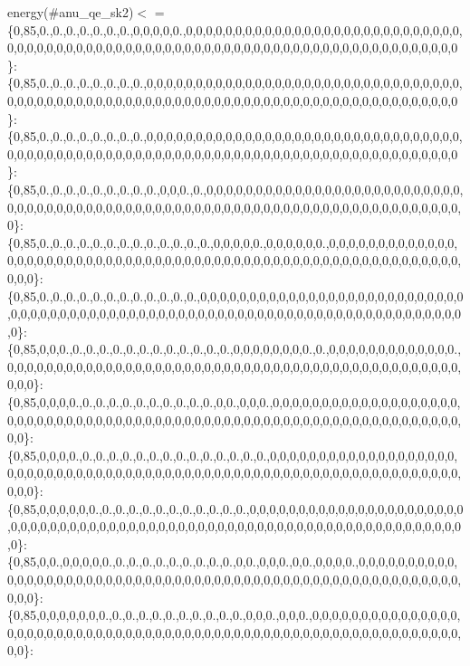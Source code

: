 energy(\#anu\+\_\+qe\+\_\+sk2)$<$  = \{0,85,0.,0.,0.,0.,0.,0.,0.,0,0,0,0,0.,0,0,0,0,0,0,0,0,0,0,0,0,0,0,0,0,0,0,0,0,0,0,0,0,0,0,0,0,0,0,0,0,0,0,0,0,0,0,0,0,0,0,0,0,0,0,0,0,0,0,0,0,0,0,0,0,0,0,0,0,0,0,0,0,0,0,0,0,0,0,0,0,0,0\}\+: \{0,85,0.,0.,0.,0.,0.,0.,0.,0.,0,0,0,0,0,0,0,0,0,0,0,0,0,0,0,0,0,0,0,0,0,0,0,0,0,0,0,0,0,0,0,0,0,0,0,0,0,0,0,0,0,0,0,0,0,0,0,0,0,0,0,0,0,0,0,0,0,0,0,0,0,0,0,0,0,0,0,0,0,0,0,0,0,0,0,0,0,0\}\+: \{0,85,0.,0.,0.,0.,0.,0.,0.,0.,0,0,0,0,0,0,0,0,0,0,0,0,0,0,0,0,0,0,0,0,0,0,0,0,0,0,0,0,0,0,0,0,0,0,0,0,0,0,0,0,0,0,0,0,0,0,0,0,0,0,0,0,0,0,0,0,0,0,0,0,0,0,0,0,0,0,0,0,0,0,0,0,0,0,0,0,0,0\}\+: \{0,85,0.,0.,0.,0.,0.,0.,0.,0.,0.,0,0,0.,0.,0,0,0,0,0,0,0,0,0,0,0,0,0,0,0,0,0,0,0,0,0,0,0,0,0,0,0,0,0,0,0,0,0,0,0,0,0,0,0,0,0,0,0,0,0,0,0,0,0,0,0,0,0,0,0,0,0,0,0,0,0,0,0,0,0,0,0,0,0,0,0,0,0\}\+: \{0,85,0.,0.,0.,0.,0.,0.,0.,0.,0.,0.,0.,0.,0.,0,0,0,0,0.,0,0,0,0,0,0.,0,0,0,0,0,0,0,0,0,0,0,0,0,0,0,0,0,0,0,0,0,0,0,0,0,0,0,0,0,0,0,0,0,0,0,0,0,0,0,0,0,0,0,0,0,0,0,0,0,0,0,0,0,0,0,0,0,0,0,0,0,0\}\+: \{0,85,0.,0.,0.,0.,0.,0.,0.,0.,0.,0.,0.,0.,0,0,0,0,0,0,0,0,0,0,0,0,0,0,0,0,0,0,0,0,0,0,0,0,0,0,0,0,0,0,0,0,0,0,0,0,0,0,0,0,0,0,0,0,0,0,0,0,0,0,0,0,0,0,0,0,0,0,0,0,0,0,0,0,0,0,0,0,0,0,0,0,0,0\}\+: \{0,85,0,0,0.,0.,0.,0.,0.,0.,0.,0.,0.,0.,0.,0.,0.,0,0,0,0,0,0,0,0.,0.,0,0,0,0,0,0,0,0,0,0,0,0,0.,0,0,0,0,0,0,0,0,0,0,0,0,0,0,0,0,0,0,0,0,0,0,0,0,0,0,0,0,0,0,0,0,0,0,0,0,0,0,0,0,0,0,0,0,0,0,0,0,0\}\+: \{0,85,0,0,0,0.,0.,0.,0.,0.,0.,0.,0.,0.,0.,0.,0,0.,0,0,0.,0,0,0,0,0,0,0,0,0,0,0,0,0,0,0,0,0,0,0,0,0,0,0,0,0,0,0,0,0,0,0,0,0,0,0,0,0,0,0,0,0,0,0,0,0,0,0,0,0,0,0,0,0,0,0,0,0,0,0,0,0,0,0,0,0,0,0\}\+: \{0,85,0,0,0,0.,0.,0.,0.,0.,0.,0.,0.,0.,0.,0.,0.,0.,0.,0.,0,0,0,0,0,0,0,0,0,0,0,0,0,0,0,0,0,0,0,0,0,0,0,0,0,0,0,0,0,0,0,0,0,0,0,0,0,0,0,0,0,0,0,0,0,0,0,0,0,0,0,0,0,0,0,0,0,0,0,0,0,0,0,0,0,0,0,0\}\+: \{0,85,0,0,0,0,0,0.,0.,0.,0.,0.,0.,0.,0.,0.,0.,0.,0.,0,0,0,0,0,0,0,0,0,0,0,0,0,0,0,0,0,0,0,0,0,0,0,0,0,0,0,0,0,0,0,0,0,0,0,0,0,0,0,0,0,0,0,0,0,0,0,0,0,0,0,0,0,0,0,0,0,0,0,0,0,0,0,0,0,0,0,0,0\}\+: \{0,85,0,0.,0,0,0,0,0.,0.,0.,0.,0.,0.,0.,0.,0.,0.,0,0.,0,0,0.,0,0.,0,0,0,0.,0,0,0,0,0,0,0,0,0,0,0,0,0,0,0,0,0,0,0,0,0,0,0,0,0,0,0,0,0,0,0,0,0,0,0,0,0,0,0,0,0,0,0,0,0,0,0,0,0,0,0,0,0,0,0,0,0,0,0\}\+: \{0,85,0,0,0,0,0,0,0.,0.,0.,0.,0.,0.,0.,0.,0.,0.,0.,0,0,0.,0,0,0.,0,0,0,0,0,0,0,0,0,0,0,0,0,0,0,0,0,0,0,0,0,0,0,0,0,0,0,0,0,0,0,0,0,0,0,0,0,0,0,0,0,0,0,0,0,0,0,0,0,0,0,0,0,0,0,0,0,0,0,0,0,0,0\}\+: 